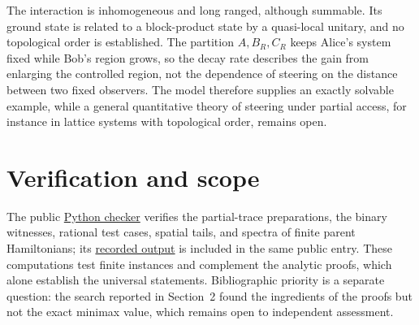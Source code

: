 \documentclass[11pt,a4paper]{article}
\theoremstyle{definition}
\theoremstyle{plain}
\begin{document}
The interaction is inhomogeneous and long ranged, although summable. Its
ground state is related to a block-product state by a quasi-local unitary,
and no topological order is established. The partition $A,B_R,C_R$ keeps
Alice's system fixed while Bob's region grows, so the decay rate describes
the gain from enlarging the controlled region, not the dependence of
steering on the distance between two fixed observers. The model therefore
supplies an exactly solvable example, while a general quantitative theory of
steering under partial access, for instance in lattice systems with
topological order, remains open.

\section{Verification and scope}
The public
\href{https://github.com/jpbruneton/open_quantum_problems/blob/main/research/entries/steering-localization/checks/verify51.py}{Python checker}
verifies the partial-trace preparations, the binary witnesses, rational test
cases, spatial tails, and spectra of finite parent Hamiltonians; its
\href{https://github.com/jpbruneton/open_quantum_problems/blob/main/research/entries/steering-localization/data/verification51.json}{recorded output}
is included in the same public entry. These computations test finite
instances and complement the analytic proofs, which alone establish the
universal statements. Bibliographic priority is a separate question: the
search reported in Section~2 found the ingredients of the proofs but not the
exact minimax value, which remains open to independent assessment.
\end{document}
